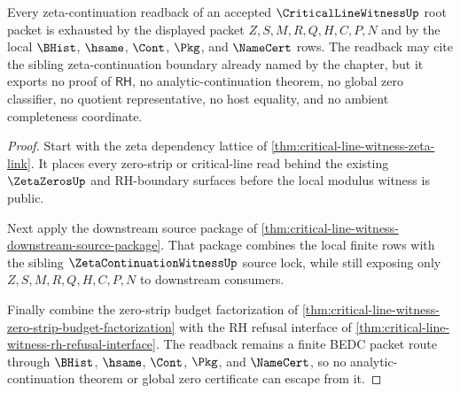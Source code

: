 \begin{theorem}
\label{thm:critical-line-witness-zeta-continuation-readback-nonescape}
Every zeta-continuation readback of an accepted $\CriticalLineWitnessUp$ root packet is exhausted by the displayed packet $Z,S,M,R,Q,H,C,P,N$ and by the local $\BHist$, $\hsame$, $\Cont$, $\Pkg$, and $\NameCert$ rows. The readback may cite the sibling zeta-continuation boundary already named by the chapter, but it exports no proof of $\mathsf{RH}$, no analytic-continuation theorem, no global zero classifier, no quotient representative, no host equality, and no ambient completeness coordinate.
\end{theorem}
\begin{proof}
Start with the zeta dependency lattice of \autoref{thm:critical-line-witness-zeta-link}. It places every zero-strip or critical-line read behind the existing $\ZetaZerosUp$ and RH-boundary surfaces before the local modulus witness is public.

Next apply the downstream source package of \autoref{thm:critical-line-witness-downstream-source-package}. That package combines the local finite rows with the sibling $\ZetaContinuationWitnessUp$ source lock, while still exposing only $Z,S,M,R,Q,H,C,P,N$ to downstream consumers.

Finally combine the zero-strip budget factorization of \autoref{thm:critical-line-witness-zero-strip-budget-factorization} with the RH refusal interface of \autoref{thm:critical-line-witness-rh-refusal-interface}. The readback remains a finite BEDC packet route through $\BHist$, $\hsame$, $\Cont$, $\Pkg$, and $\NameCert$, so no analytic-continuation theorem or global zero certificate can escape from it.
\end{proof}
